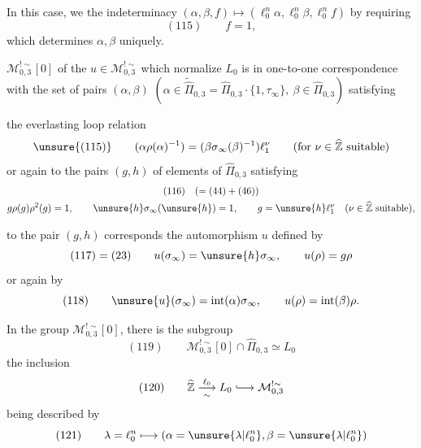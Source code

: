 
In this case, we  the indeterminacy
$(\alpha,\beta,f)\longmapsto
(\ell_0^n\alpha,\ell_0^n\beta,\ell_0^n f)$
by requiring
\[
 (115)\qquad f=1,
\]
which determines $\alpha,\beta$ uniquely.

$\mathcal M_{0,3}^{!\sim}[0]$ of the $u\in\mathcal M_{0,3}^{!\sim}$
which normalize $L_0$ is in one-to-one correspondence with the set of pairs
$(\alpha,\beta)$
$(\alpha\in\widetilde{\widehat{\Pi}}_{0,3}
=\widehat{\Pi}_{0,3}\cdot\{1,\tau_\infty\},
\ \beta\in\widehat{\Pi}_{0,3})$ satisfying



the everlasting loop relation
\[
 \unsure{(115)}\qquad
 (\alpha\rho(\alpha)^{-1})
 =(\beta\sigma_\infty(\beta)^{-1})\ell_1^\nu
 \qquad(\text{for }\nu\in\widehat{\mathbb Z}\text{ suitable})
\]
or again to the pairs $(g,h)$
of elements of $\widehat{\Pi}_{0,3}$ satisfying
\[
 \begin{gathered}
 (116)\quad (=(44)+(46))\\
 g\rho(g)\rho^2(g)=1,\qquad
 \unsure{h}\sigma_\infty(\unsure{h})=1,\qquad
 g=\unsure{h}\ell_1^\nu\quad
 (\nu\in\widehat{\mathbb Z}\text{ suitable}),
 \end{gathered}
\]


to the pair 
$(g,h)$ corresponds the automorphism $u$ defined by
\[
 (117)=(23)\qquad
 u(\sigma_\infty)=\unsure{h}\sigma_\infty,\qquad
 u(\rho)=g\rho
\]
or again by
\[
 (118)\qquad
 \unsure{u}(\sigma_\infty)=\mathrm{int}(\alpha)\sigma_\infty,\qquad
 u(\rho)=\mathrm{int}(\beta)\rho.
\]

In the group $\mathcal M_{0,3}^{!\sim}[0]$, there is the subgroup
\[
 (119)\qquad
 \mathcal M_{0,3}^{!\sim}[0]\cap\widehat{\Pi}_{0,3}\simeq L_0
\]
the inclusion
\[
 (120)\qquad
 \widehat{\mathbb Z}\overset{\ell_0}{\underset{\sim}{\longrightarrow}}
 L_0\lhook\joinrel\longrightarrow\mathcal M_{0,3}^{!\sim}
\]
being described by
\[
 (121)\qquad
 \lambda=\ell_0^n\longmapsto
 (\alpha=\unsure{\lambda|\ell_0^n},
 \beta=\unsure{\lambda|\ell_0^n})
\]

